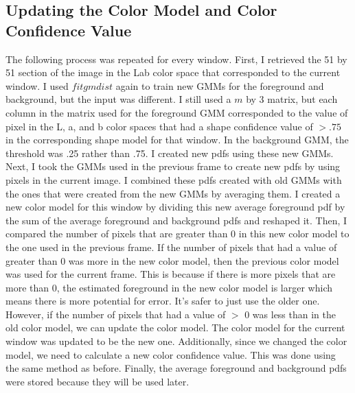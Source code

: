 \documentclass[10pt]{article}
\begin{document}
\subsection{Updating the Color Model and Color Confidence Value}
The following process was repeated for every window. First, I retrieved the 51 by 51 section of the image in the Lab color space that corresponded to the current window. I used $fitgmdist$ again to train new GMMs for the foreground and background, but the input was different. I still used a $m$ by 3 matrix, but each column in the matrix used for the foreground GMM corresponded to the value of pixel in the L, a, and b color spaces that had a shape confidence value of $> .75$ in the corresponding shape model for that window. In the background GMM, the threshold was .25 rather than .75. I created new pdfs using these new GMMs. Next, I took the GMMs used in the previous frame to create new pdfs by using pixels in the current image. I combined these pdfs created with old GMMs with the ones that were created from the new GMMs by averaging them. I created a new color model for this window by dividing this new average foreground pdf by the sum of the average foreground and background pdfs and reshaped it. Then, I compared the number of pixels that are greater than 0 in this new color model to the one used in the previous frame. If the number of pixels that had a value of greater than 0 was more in the new color model, then the previous color model was used for the current frame. This is because if there is more pixels that are more than 0, the estimated foreground in the new color model is larger which means there is more potential for error. It's safer to just use the older one. However, if the number of pixels that had a value of $>$ 0 was less than in the old color model, we can update the color model. The color model for the current window was updated to be the new one. Additionally, since we changed the color model, we need to calculate a new color confidence value. This was done using the same method as before. Finally, the average foreground and background pdfs were stored because they will be used later.
\end{document}
